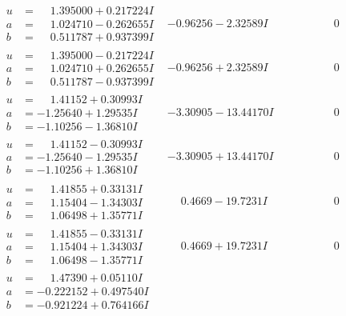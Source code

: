 \documentclass[1p]{elsarticle_modified}
\theoremstyle{definition}
\begin{document}
$$\begin{array}{c|c|c}
\begin{aligned}
u &= \phantom{-}1.395000 + 0.217224 I \\
a &= \phantom{-}1.024710 - 0.262655 I \\
b &= \phantom{-}0.511787 + 0.937399 I\end{aligned}
 & -0.96256 - 2.32589 I & \phantom{-0.000000 } 0 \\ \hline\begin{aligned}
u &= \phantom{-}1.395000 - 0.217224 I \\
a &= \phantom{-}1.024710 + 0.262655 I \\
b &= \phantom{-}0.511787 - 0.937399 I\end{aligned}
 & -0.96256 + 2.32589 I & \phantom{-0.000000 } 0 \\ \hline\begin{aligned}
u &= \phantom{-}1.41152 + 0.30993 I \\
a &= -1.25640 + 1.29535 I \\
b &= -1.10256 - 1.36810 I\end{aligned}
 & -3.30905 - 13.44170 I & \phantom{-0.000000 } 0 \\ \hline\begin{aligned}
u &= \phantom{-}1.41152 - 0.30993 I \\
a &= -1.25640 - 1.29535 I \\
b &= -1.10256 + 1.36810 I\end{aligned}
 & -3.30905 + 13.44170 I & \phantom{-0.000000 } 0 \\ \hline\begin{aligned}
u &= \phantom{-}1.41855 + 0.33131 I \\
a &= \phantom{-}1.15404 - 1.34303 I \\
b &= \phantom{-}1.06498 + 1.35771 I\end{aligned}
 & \phantom{-}0.4669 - 19.7231 I & \phantom{-0.000000 } 0 \\ \hline\begin{aligned}
u &= \phantom{-}1.41855 - 0.33131 I \\
a &= \phantom{-}1.15404 + 1.34303 I \\
b &= \phantom{-}1.06498 - 1.35771 I\end{aligned}
 & \phantom{-}0.4669 + 19.7231 I & \phantom{-0.000000 } 0 \\ \hline\begin{aligned}
u &= \phantom{-}1.47390 + 0.05110 I \\
a &= -0.222152 + 0.497540 I \\
b &= -0.921224 + 0.764166 I\end{aligned}

\end{array}$$
\end{document}
